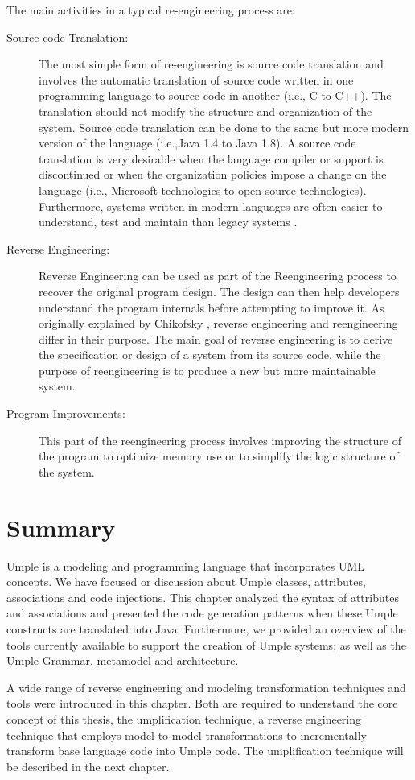 The main activities in a typical re-engineering process are:

\begin{description}
\item[Source code Translation:]
The most simple form of re-engineering is source code translation and involves the automatic translation of source code written in one programming language to source code in another (i.e., C to C++). The translation should not modify the structure and organization of the system. Source code translation can be done to the same but more modern version of the language (i.e.,Java 1.4 to Java 1.8). A source code translation is very desirable when the language compiler or support is discontinued or when the organization policies impose a change on the language (i.e., Microsoft technologies to open source technologies). Furthermore, systems written in modern languages are often easier to understand, test and maintain than legacy systems \cite{Pressman2001}.

\item[Reverse Engineering:]
Reverse Engineering can be used as part of the Reengineering process to recover the original program design. The design can then help developers understand the program internals before attempting to improve it. As originally explained by Chikofsky  \cite{Chikofsky}, reverse engineering and reengineering differ in their purpose. The main goal of reverse engineering is to derive the specification or design of a system from its source code, while the purpose of reengineering is to produce a new but more maintainable system. 

\item[Program Improvements:]
This part of the reengineering process involves improving the structure of the program to optimize memory use or to simplify the logic structure of the system. 
\end{description}

\section{Summary}

Umple is a modeling and programming language that incorporates UML concepts. We have focused or discussion about Umple classes, attributes, associations and code injections. This chapter analyzed the syntax of attributes and associations and presented the code generation patterns when these Umple constructs are translated into Java. Furthermore, we provided an overview of the tools currently available to support the creation of Umple systems; as well as the Umple Grammar, metamodel and architecture.

A wide range of reverse engineering and modeling transformation techniques and tools were introduced in this chapter. Both are required to understand the core concept of this thesis, the umplification technique, a reverse engineering technique that employs model-to-model transformations to  incrementally transform base language code into Umple code. The umplification technique will be described in the next chapter.
